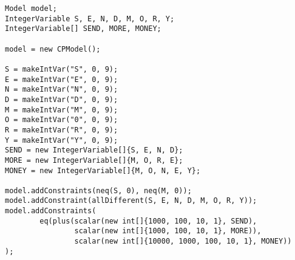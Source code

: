 \begin{lstlisting}[title=SendMoreMoney problem,captionpos=b]  
Model model;                                                                                                     
IntegerVariable S, E, N, D, M, O, R, Y;                                                                          
IntegerVariable[] SEND, MORE, MONEY;                                                                             
                                                                                                                 
model = new CPModel();                                                                                           
                                                                                                                 
S = makeIntVar("S", 0, 9);                                                                                       
E = makeIntVar("E", 0, 9);                                                                                       
N = makeIntVar("N", 0, 9);                                                                                       
D = makeIntVar("D", 0, 9);                                                                                       
M = makeIntVar("M", 0, 9);                                                                                       
O = makeIntVar("0", 0, 9);                                                                                       
R = makeIntVar("R", 0, 9);                                                                                       
Y = makeIntVar("Y", 0, 9);                                                                                       
SEND = new IntegerVariable[]{S, E, N, D};                                                                        
MORE = new IntegerVariable[]{M, O, R, E};                                                                        
MONEY = new IntegerVariable[]{M, O, N, E, Y};                                                                    
                                                                                                                 
model.addConstraints(neq(S, 0), neq(M, 0));                                                                      
model.addConstraint(allDifferent(S, E, N, D, M, O, R, Y));                                                       
model.addConstraints(                                                                                            
        eq(plus(scalar(new int[]{1000, 100, 10, 1}, SEND),                                                       
                scalar(new int[]{1000, 100, 10, 1}, MORE)),                                                      
                scalar(new int[]{10000, 1000, 100, 10, 1}, MONEY))                                               
);                                                                                                               
                                                                                                                 

\end{lstlisting}
